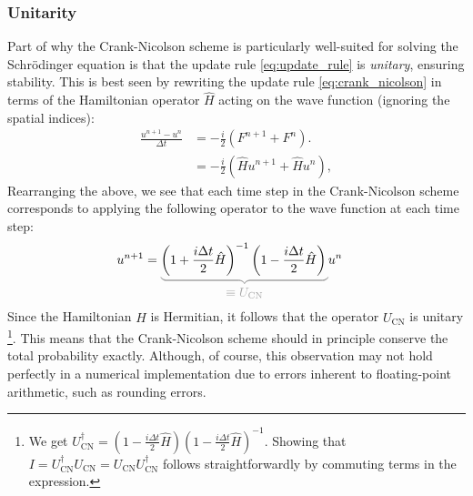\documentclass[aps,pra,reprint,amsmath,amssymb,twocolumn,preprintnumbers,superscriptaddress,10pt]{revtex4-2}
\begin{document}
\subsubsection{Unitarity}  \label{sec:Unitarity_Crank_Nicolson}
Part of why the Crank-Nicolson scheme is particularly well-suited for solving the Schrödinger equation is that the update rule \eqref{eq:update_rule} is \emph{unitary}, ensuring stability.
This is best seen by rewriting the update rule \eqref{eq:crank_nicolson} in terms of the Hamiltonian operator \(\hat{H}\) acting on the wave function (ignoring the spatial indices):
\begin{align}
    \frac{u^{n+1} - u^{n}}{\Delta t} 
    &= 
    -\frac{i}{2} \left( F^{n+1} + F^{n} \right). 
    \\
    &=
    -\frac{i}{2} \left( \hat{H} u^{n+1} + \hat{H} u^{n} \right),
\end{align}
Rearranging the above, we see that each time step in the Crank-Nicolson scheme corresponds to applying the following operator to the wave function at each time step:
\begin{align}
    u^{n+1} 
    &=
    \textcolor{gray!70}{
        \underbrace{
        \textcolor{black}{
            \left( 1 + \frac{i \Delta t}{2} \hat{H} \right)^{-1}
            \left( 1 - \frac{i \Delta t}{2} \hat{H} \right)
            \vphantom{\rule{0pt}{1.4em}}
        }}_{\raisebox{-3pt}{$\equiv U_{\text{CN}}$}} 
    }
    u^{n}
\end{align}
Since the Hamiltonian \(\hat{H}\) is Hermitian, it follows that the operator $U_{\text{CN}}$ is unitary \footnote{We get \({U_{\text{CN}}^{\dag} = \left( 1 - \frac{i \Delta t}{2} \hat{H} \right)\left( 1 - \frac{i \Delta t}{2} \hat{H} \right)^{-1}}\). Showing that \({I=U_{\text{CN}}^{\dag}U_{\text{CN}} = U_{\text{CN}} U_{\text{CN}}^{\dag}}\) follows straightforwardly by commuting terms in the expression.}.
This means that the Crank-Nicolson scheme should in principle conserve the total probability exactly.
Although, of course, this observation may not hold perfectly in a numerical implementation due to errors inherent to floating-point arithmetic, such as rounding errors.
\end{document}
